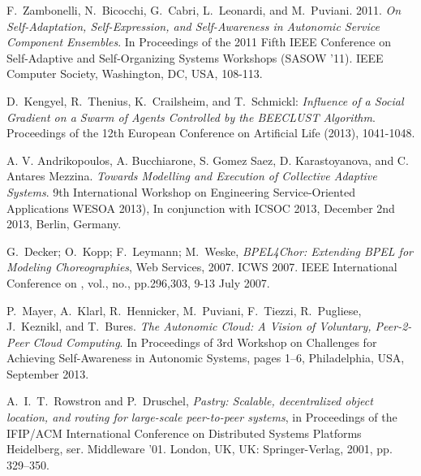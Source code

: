\begin{thebibliography}{1}
F.~Zambonelli, N.~Bicocchi, G.~Cabri, L.~Leonardi, and M.~Puviani. 2011. \emph{On Self-Adaptation, Self-Expression, and Self-Awareness in Autonomic Service Component Ensembles}. In Proceedings of the 2011 Fifth IEEE Conference on Self-Adaptive and Self-Organizing Systems Workshops (SASOW '11). IEEE Computer Society, Washington, DC, USA, 108-113.

D.~Kengyel, R.~Thenius, K.~Crailsheim, and T.~Schmickl: \emph{Influence of a Social Gradient on a Swarm of Agents Controlled by the BEECLUST Algorithm}. Proceedings of the 12th European Conference on Artificial Life (2013), 1041-1048.

A. V. Andrikopoulos, A. Bucchiarone, S. Gomez Saez, D. Karastoyanova, and C. Antares Mezzina. \emph{Towards Modelling and Execution of Collective Adaptive Systems}. 9th International Workshop on Engineering Service-Oriented Applications WESOA 2013), In conjunction with ICSOC 2013, December 2nd 2013, Berlin, Germany.

G.~Decker; O.~Kopp; F.~Leymann; M.~Weske, \emph{BPEL4Chor: Extending BPEL for Modeling Choreographies}, Web Services, 2007. ICWS 2007. IEEE International Conference on , vol., no., pp.296,303, 9-13 July 2007.





P.~Mayer, A.~Klarl, R.~Hennicker, M.~Puviani, F.~Tiezzi, R.~Pugliese, J.~Keznikl, and T.~Bures. \emph{The Autonomic Cloud: A Vision of Voluntary, Peer-2-Peer Cloud Computing}. In Proceedings of 3rd Workshop on Challenges for Achieving Self-Awareness in Autonomic Systems, pages 1–6, Philadelphia, USA, September 2013.

A.~I.~T.~Rowstron and P.~Druschel, \emph{Pastry: Scalable, decentralized object location, and routing for large-scale peer-to-peer systems}, in Proceedings of the IFIP/ACM International Conference on Distributed Systems Platforms Heidelberg, ser. Middleware ’01. London, UK, UK: Springer-Verlag, 2001, pp. 329–350.


\end{thebibliography}
